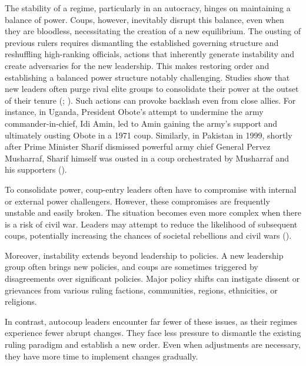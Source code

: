 \documentclass[
  12pt,
]{report}
\begin{document}
\begin{itemize}
  The stability of a regime, particularly in an autocracy, hinges on
  maintaining a balance of power. Coups, however, inevitably disrupt
  this balance, even when they are bloodless, necessitating the creation
  of a new equilibrium. The ousting of previous rulers requires
  dismantling the established governing structure and reshuffling
  high-ranking officials, actions that inherently generate instability
  and create adversaries for the new leadership. This makes restoring
  order and establishing a balanced power structure notably challenging.
  Studies show that new leaders often purge rival elite groups to
  consolidate their power at the outset of their tenure
  (;
  ). Such actions can provoke
  backlash even from close allies. For instance, in Uganda, President
  Obote's attempt to undermine the army commander-in-chief, Idi Amin,
  led to Amin gaining the army's support and ultimately ousting Obote in
  a 1971 coup. Similarly, in Pakistan in 1999, shortly after Prime
  Minister Sharif dismissed powerful army chief General Pervez
  Musharraf, Sharif himself was ousted in a coup orchestrated by
  Musharraf and his supporters ().

  To consolidate power, coup-entry leaders often have to compromise with
  internal or external power challengers. However, these compromises are
  frequently unstable and easily broken. The situation becomes even more
  complex when there is a risk of civil war. Leaders may attempt to
  reduce the likelihood of subsequent coups, potentially increasing the
  chances of societal rebellions and civil wars
  ().

  Moreover, instability extends beyond leadership to policies. A new
  leadership group often brings new policies, and coups are sometimes
  triggered by disagreements over significant policies. Major policy
  shifts can instigate dissent or grievances from various ruling
  factions, communities, regions, ethnicities, or religions.

  In contrast, autocoup leaders encounter far fewer of these issues, as
  their regimes experience fewer abrupt changes. They face less pressure
  to dismantle the existing ruling paradigm and establish a new order.
  Even when adjustments are necessary, they have more time to implement
  changes gradually.
\end{itemize}

\begingroup
\setlength{}
\setlength{}\fontsize{12.0pt}{14.4pt}\selectfont
\end{document}
